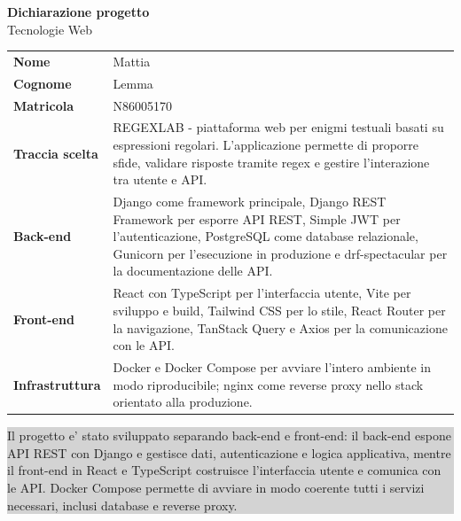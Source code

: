 \documentclass[11pt,a4paper]{article}
\begin{document}
\begin{center}
    {\Large\bfseries Dichiarazione progetto}\\[0.25cm]
    {\normalsize Tecnologie Web}
\end{center}

\vspace{0.55cm}

\begin{tabular}{>{\bfseries}p{3.75cm} p{11.05cm}}
Nome & Mattia \\
Cognome & Lemma \\
Matricola & N86005170 \\
Traccia scelta & REGEXLAB - piattaforma web per enigmi testuali basati su espressioni regolari. L'applicazione permette di proporre sfide, validare risposte tramite regex e gestire l'interazione tra utente e API. \\
Back-end & Django come framework principale, Django REST Framework per esporre API REST, Simple JWT per l'autenticazione, PostgreSQL come database relazionale, Gunicorn per l'esecuzione in produzione e drf-spectacular per la documentazione delle API. \\
Front-end & React con TypeScript per l'interfaccia utente, Vite per sviluppo e build, Tailwind CSS per lo stile, React Router per la navigazione, TanStack Query e Axios per la comunicazione con le API. \\
Infrastruttura & Docker e Docker Compose per avviare l'intero ambiente in modo riproducibile; nginx come reverse proxy nello stack orientato alla produzione. \\
\end{tabular}

\vfill

\begin{center}
    \colorbox{lightgray}{%
        \parbox{0.9\textwidth}{%
            \small
            Il progetto e' stato sviluppato separando back-end e front-end: il back-end espone API REST
            con Django e gestisce dati, autenticazione e logica applicativa, mentre il front-end in React
            e TypeScript costruisce l'interfaccia utente e comunica con le API. Docker Compose permette
            di avviare in modo coerente tutti i servizi necessari, inclusi database e reverse proxy.
        }%
    }
\end{center}
\end{document}
